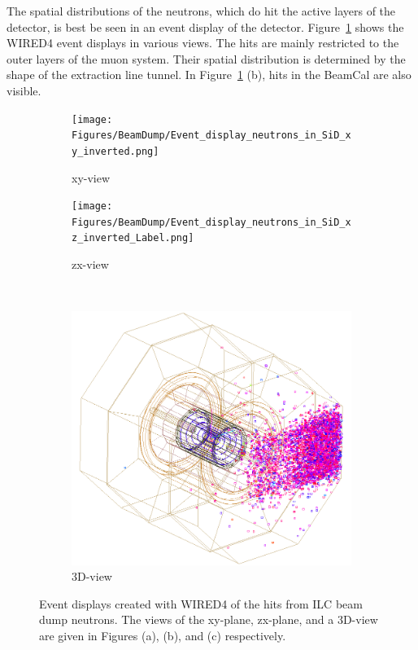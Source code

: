 The spatial distributions of the neutrons, which do hit the active layers of the \sid detector, is best be seen in an event display of the \sid detector.
Figure~\ref{fig:BeamDumps:NeutronEventDisplays} shows the WIRED4 event displays in various views.
The hits are mainly restricted to the outer layers of the muon system.
Their spatial distribution is determined by the shape of the extraction line tunnel.
In Figure~\ref{fig:BeamDumps:NeutronEventDisplays} (b), hits in the \sid BeamCal are also visible.
\begin{figure}
 \centering
  \begin{subfigure}[b]{0.4\textwidth}
   \centering
    \texttt{[image: Figures/BeamDump/Event\_display\_neutrons\_in\_SiD\_xy\_inverted.png]}
   \caption{xy-view}
   \end{subfigure}
   \hfill
   \begin{subfigure}[b]{0.4\textwidth}
   \centering
    \texttt{[image: Figures/BeamDump/Event\_display\_neutrons\_in\_SiD\_xz\_inverted\_Label.png]}
   \caption{zx-view}
   \end{subfigure}\\
    \begin{subfigure}[b]{0.4\textwidth}
   \centering
    \includegraphics[width=\textwidth]{Figures/BeamDump/Event_display_neutrons_in_SiD_3D_inverted.png}
   \caption{3D-view}
   \end{subfigure}
   \caption[Event displays of the beam dump neutron hits in \sid]{Event displays created with WIRED4 of the \sid hits from ILC beam dump neutrons.
   The views of the xy-plane, zx-plane, and a 3D-view are given in Figures (a), (b), and (c) respectively.}
   \label{fig:BeamDumps:NeutronEventDisplays}
\end{figure} 
